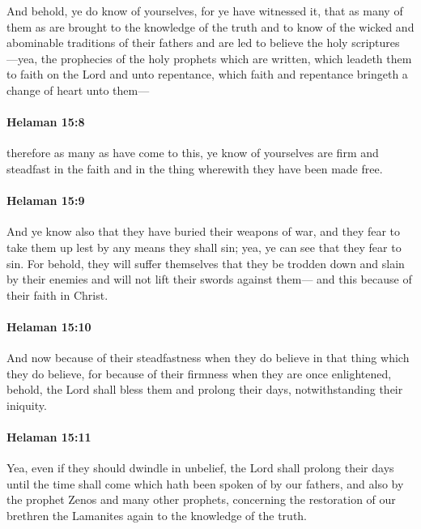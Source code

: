 			And behold, ye do know of yourselves,
			for ye have witnessed it,
			that as many of them as are brought to the knowledge of the truth
			and to know of the wicked and abominable traditions of their fathers
			and are led to believe the holy scriptures
			---yea, the prophecies of the holy prophets which are written,
			which leadeth them to faith on the Lord and unto repentance,
			which faith and repentance bringeth a change of heart unto them---

		\paragraph{Helaman 15:8} %
			\label{HELAMAN-15-8}

			therefore as many as have come to this,
			ye know of yourselves are firm and steadfast in the faith
			and in the thing wherewith they have been made free.

		\paragraph{Helaman 15:9} %
			\label{HELAMAN-15-9}

			And ye know also that they have buried their weapons of war,
			and they fear to take them up lest by any means they shall sin;
			yea, ye can see that they fear to sin.
			For behold, they will suffer themselves
			that they be trodden down and slain by their enemies
			and will not lift their swords against them---
			and this because of their faith in Christ.

		\paragraph{Helaman 15:10} %
			\label{HELAMAN-15-10}

			And now because of their steadfastness
			when they do believe in that thing which they do believe,
			for because of their firmness when they are once enlightened,
			behold, the Lord shall bless them and prolong their days,
			notwithstanding their iniquity.

		\paragraph{Helaman 15:11} %
			\label{HELAMAN-15-11}

			Yea, even if they should dwindle in unbelief,
			the Lord shall prolong their days
			until the time shall come which hath been spoken of by our fathers,
			and also by the prophet Zenos and many other prophets,
			concerning the restoration of our brethren the Lamanites again
			to the knowledge of the truth.

